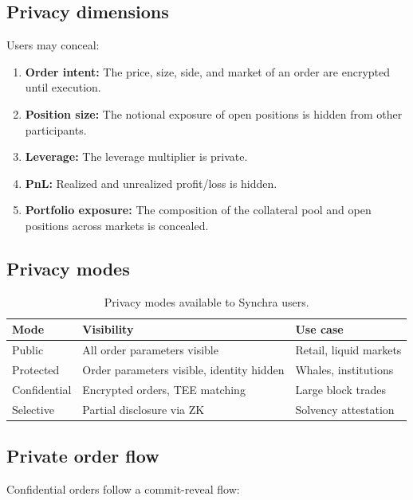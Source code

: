 \documentclass[11pt,a4paper]{article}
\begin{document}
\subsection{Privacy dimensions}

Users may conceal:

\begin{enumerate}
  \item \textbf{Order intent:} The price, size, side, and market of an order are encrypted until execution.
  \item \textbf{Position size:} The notional exposure of open positions is hidden from other participants.
  \item \textbf{Leverage:} The leverage multiplier is private.
  \item \textbf{PnL:} Realized and unrealized profit/loss is hidden.
  \item \textbf{Portfolio exposure:} The composition of the collateral pool and open positions across markets is concealed.
\end{enumerate}

\subsection{Privacy modes}

\begin{table}[h]
  \centering
  \begin{tabular}{lll}
    \toprule
    \textbf{Mode} & \textbf{Visibility} & \textbf{Use case} \\
    \midrule
    Public & All order parameters visible & Retail, liquid markets \\
    Protected & Order parameters visible, identity hidden & Whales, institutions \\
    Confidential & Encrypted orders, TEE matching & Large block trades \\
    Selective & Partial disclosure via ZK & Solvency attestation \\
    \bottomrule
  \end{tabular}
  \caption{Privacy modes available to Synchra users.}
  \label{tab:privacy}
\end{table}

\subsection{Private order flow}

Confidential orders follow a commit-reveal flow:
\end{document}
